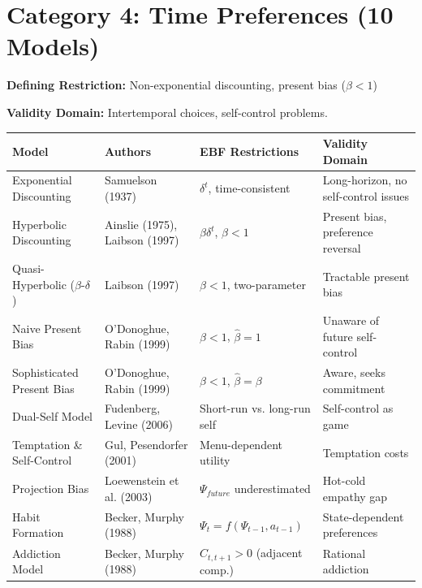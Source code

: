 \section{Category 4: Time Preferences (10 Models)}
\label{sec:ms-time}

\begin{tcolorbox}[colback=gray!5!white, colframe=gray!75!black,
    title=\textbf{Time Preferences: The Discounting Extension}]

\textbf{Defining Restriction:} Non-exponential discounting, present bias ($\beta < 1$)

\textbf{Validity Domain:} Intertemporal choices, self-control problems.

\end{tcolorbox}

\small
\begin{longtable}{@{}p{3cm}p{2.5cm}p{4cm}p{4cm}@{}}
\toprule
\textbf{Model} & \textbf{Authors} & \textbf{EBF Restrictions} & \textbf{Validity Domain} \\
\midrule
\endhead

Exponential Discounting & Samuelson (1937) &
$\delta^t$, time-consistent &
Long-horizon, no self-control issues \\

Hyperbolic Discounting & Ainslie (1975), Laibson (1997) &
$\beta\delta^t$, $\beta < 1$ &
Present bias, preference reversal \\

Quasi-Hyperbolic ($\beta$-$\delta$) & Laibson (1997) &
$\beta < 1$, two-parameter &
Tractable present bias \\

Naive Present Bias & O'Donoghue, Rabin (1999) &
$\beta < 1$, $\hat{\beta} = 1$ &
Unaware of future self-control \\

Sophisticated Present Bias & O'Donoghue, Rabin (1999) &
$\beta < 1$, $\hat{\beta} = \beta$ &
Aware, seeks commitment \\

Dual-Self Model & Fudenberg, Levine (2006) &
Short-run vs. long-run self &
Self-control as game \\

Temptation \& Self-Control & Gul, Pesendorfer (2001) &
Menu-dependent utility &
Temptation costs \\

Projection Bias & Loewenstein et al. (2003) &
$\Psi_{future}$ underestimated &
Hot-cold empathy gap \\

Habit Formation & Becker, Murphy (1988) &
$\Psi_t = f(\Psi_{t-1}, a_{t-1})$ &
State-dependent preferences \\

Addiction Model & Becker, Murphy (1988) &
$C_{t,t+1} > 0$ (adjacent comp.) &
Rational addiction \\

\bottomrule
\end{longtable}
\normalsize

